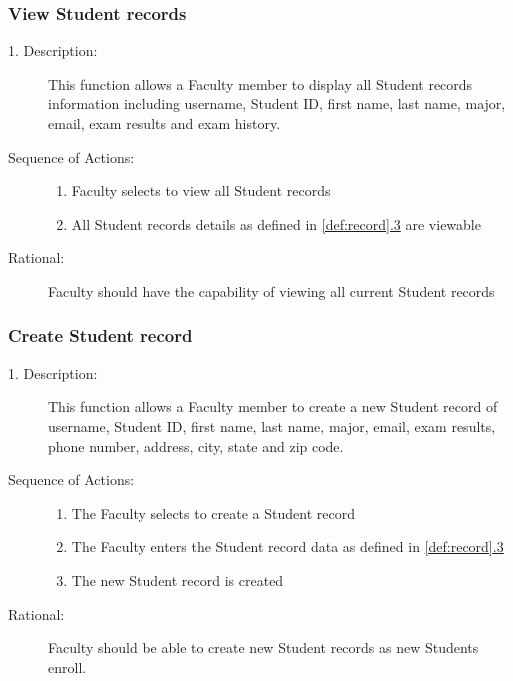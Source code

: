    \subsubsection{\large View Student records} 
   \begin{boxed} %
      \begin{description}
         \item[1. Description:\label{desc:view_records}]
      This function allows a Faculty member to display all Student
         records information including username, Student ID, first name, last
         name, major, email, exam results and exam history.
         
            \item[Sequence of Actions:]\hspace{10cm}
         \begin{enumerate}
            \item Faculty selects to view all Student records
            \item All Student records details as defined in \autoref{def:record}\hyperref[def:record]{.3} are viewable
      \end{enumerate}

            \item[Rational:]
         Faculty should have the capability of viewing all current Student
         records
      \end{description}
   \end{boxed} %

   \subsubsection{\large Create Student record} 
   \begin{boxed} %
      \begin{description}
         \item[1. Description:\label{desc:create_record}]
      This function allows a Faculty member to create a new Student
         record of username, Student ID, first name, last name, major, email,
         exam results, phone number, address, city, state and zip code.
         
            \item[Sequence of Actions:]\hspace{10cm}
         \begin{enumerate}
            \item The Faculty selects to create a Student record
            \item The Faculty enters the Student record data as defined in
               \autoref{def:record}\hyperref[def:record]{.3}
            \item The new Student record is created
      \end{enumerate}

            \item[Rational:]
         Faculty should be able to create new Student records as new Students
         enroll.
      \end{description}
   \end{boxed} %

